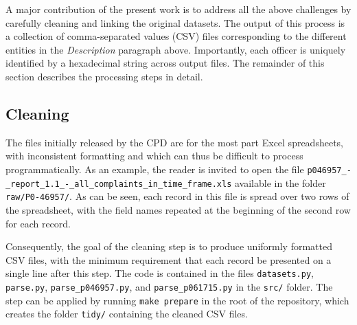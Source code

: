 A major contribution of the present work is to address all the above challenges
by carefully cleaning and linking the original datasets. The output of this
process is a collection of comma-separated values (CSV) files corresponding to
the different entities in the \emph{Description} paragraph above.
Importantly, each officer is uniquely identified by a hexadecimal string across
output files. The
remainder of this section describes the processing steps in detail.

\subsection{Cleaning}

The files initially released by the CPD are for
the most part Excel spreadsheets, with inconsistent formatting and which can
thus be difficult to process programmatically. As an example, the reader is
invited to open the file
\texttt{p046957\_-\_report\_1.1\_-\_all\_complaints\_in\_time\_frame.xls}
available in the folder \texttt{raw/P0-46957/}. As can be seen, each record in
this file is spread over two rows of the spreadsheet, with the field names
repeated at the beginning of the second row for each record.

Consequently, the goal of the cleaning step is to produce uniformly formatted
CSV files, with the minimum requirement that each record be presented on
a single line after this step. The code is contained in the files
\texttt{datasets.py}, \texttt{parse.py}, \texttt{parse\_p046957.py}, and \texttt{parse\_p061715.py} in the
\texttt{src/} folder.  The step can be applied by running \texttt{make prepare}
in the root of the repository, which creates the folder \texttt{tidy/}
containing the cleaned CSV files.

